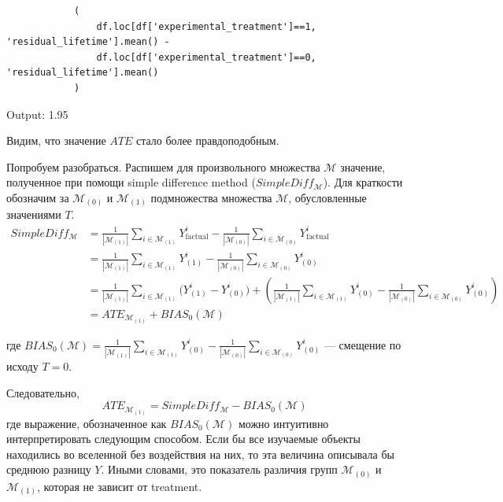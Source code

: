         

        \begin{verbatim}
            (
                df.loc[df['experimental_treatment']==1, 'residual_lifetime'].mean() -
                df.loc[df['experimental_treatment']==0, 'residual_lifetime'].mean()
            )
        \end{verbatim}

        Output: 1.95

        Видим, что значение $ATE$ стало более правдоподобным.

        Попробуем разобраться.
        Распишем для произвольного множества $\mathcal{M}$ значение, полученное при помощи simple difference method ($SimpleDiff_\mathcal{M}$).
        Для краткости обозначим за $\mathcal{M}_{(0)}$ и $\mathcal{M}_{(1)}$ подмножества множества $\mathcal{M}$, обусловленные значениями $T$.
        \begin{align*}
            SimpleDiff_\mathcal{M} &=
            \frac{1}{|\mathcal{M}_{(1)}|} \sum_{i \in \mathcal{M}_{(1)}} Y^i_{\text{factual}} -
            \frac{1}{|\mathcal{M}_{(0)}|} \sum_{i \in \mathcal{M}_{(0)}} Y^i_{\text{factual}} \\
            &= \frac{1}{|\mathcal{M}_{(1)}|} \sum_{i \in \mathcal{M}_{(1)}} Y^i_{(1)} -
            \frac{1}{|\mathcal{M}_{(0)}|} \sum_{i \in \mathcal{M}_{(0)}} Y^i_{(0)} \\
            &= \frac{1}{|\mathcal{M}_{(1)}|} \sum_{i \in \mathcal{M}_{(1)}} \big( Y^i_{(1)} - Y^i_{(0)} \big) +
            \left( \frac{1}{|\mathcal{M}_{(1)}|} \sum_{i \in \mathcal{M}_{(1)}} Y^i_{(0)} -
            \frac{1}{|\mathcal{M}_{(0)}|} \sum_{i \in \mathcal{M}_{(0)}} Y^i_{(0)} \right) \\
            &= ATE_{\mathcal{M}_{(1)}} + BIAS_0(\mathcal{M})
        \end{align*}

        где $BIAS_0(\mathcal{M}) = \frac{1}{|\mathcal{M}_{(1)}|} \sum_{i \in \mathcal{M}_{(1)}} Y^i_{(0)} -
            \frac{1}{|\mathcal{M}_{(0)}|} \sum_{i \in \mathcal{M}_{(0)}} Y^i_{(0)}$ --- смещение по исходу $T=0$.

        Следовательно,
        \[
            ATE_{\mathcal{M}_{(1)}} = SimpleDiff_\mathcal{M} - BIAS_0(\mathcal{M})
        \]
        где выражение, обозначенное как $BIAS_0(\mathcal{M})$ можно интуитивно интерпретировать следующим способом.
        Если бы все изучаемые объекты находились во вселенной без воздействия на них, то эта величина описывала бы среднюю разницу $Y$.
        Иными словами, это показатель различия групп $\mathcal{M}_{(0)}$ и $\mathcal{M}_{(1)}$, которая не зависит от treatment.


